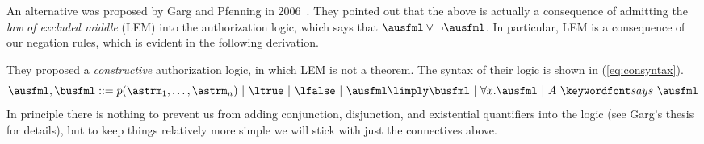 \documentclass[11pt,twoside]{scrartcl}
\begin{document}
An alternative was proposed by Garg and Pfenning in 2006~\cite{Garg06}. They pointed out that the above is actually a consequence of admitting the \emph{law of excluded middle} (LEM) into the authorization logic, which says that $\ausfml \lor \lnot\ausfml$. In particular, LEM is a consequence of our negation rules, which is evident in the following derivation.
\begin{sequentdeduction}[array]
\linfer[notr] {
  \linfer[id] {\lclose}
  {\lsequent{\ausfml}{\ausfml}}
} {
  \lsequent{}{\ausfml,\lnot\ausfml}
}
\end{sequentdeduction}
They proposed a \emph{constructive} authorization logic, in which LEM is not a theorem. The syntax of their logic is shown in (\ref{eq:consyntax}).
\begin{equation}
\label{eq:consyntax}
\ausfml,\busfml \bebecomes
p(\astrm_1,\ldots,\astrm_n) \alternative
\ltrue \alternative
\lfalse \alternative
\ausfml \limply \busfml \alternative
\forall x.\ausfml \alternative
\says{A}{\ausfml}
\end{equation}
In principle there is nothing to prevent us from adding conjunction, disjunction, and existential quantifiers into the logic (see Garg's thesis~\cite{Garg2009} for details), but to keep things relatively more simple we will stick with just the connectives above.
\end{document}
